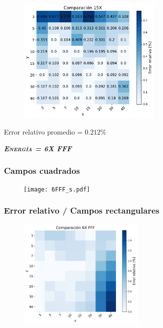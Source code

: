 \documentclass[aspectratio=169,xcolor=dvipsnames,t]{beamer}
\begin{document}
\begin{frame}

      \begin{figure}
            \centering
            \includegraphics[width=0.63\textwidth]{15X_hm2.pdf}
      \end{figure}

      \vspace{-20pt}
      \begin{flushright}
      \tiny{Error relativo promedio = $0.212 \%$}
      \end{flushright}

\end{frame}



\begin{frame}[standout]
      \centering\LARGE
      \textbf{\itshape\scshape Energía = 6X FFF} 
\end{frame}

\begin{frame}
      \frametitle{Campos cuadrados}

      \begin{figure}
            \centering
            \texttt{[image: 6FFF\_s.pdf]}
      \end{figure}

\end{frame}

\begin{frame}
      \frametitle{Error relativo / Campos rectangulares}

      \begin{figure}
            \centering
            \includegraphics[width=0.55\textwidth]{6FFF_hm1.pdf}
      \end{figure}

\end{frame}
\end{document}
